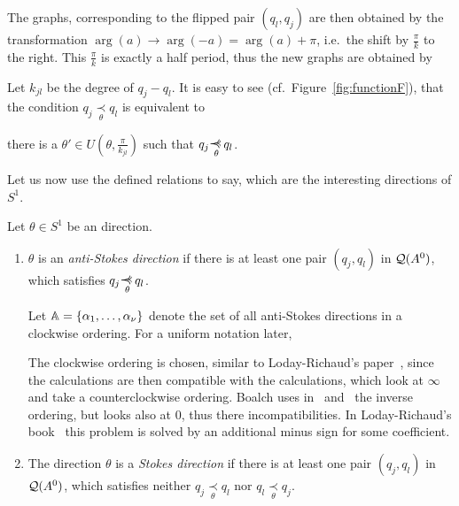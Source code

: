 The graphs, corresponding to the flipped pair $(q_l,q_j)$ are then obtained by
the transformation $\arg(a)\to\arg(-a)=\arg(a)+\pi$, i.e.\ the shift by
$\frac{\pi}{k}$ to the right. This $\frac{\pi}{k}$ is exactly a half period,
thus the new graphs are obtained by 
\begin{rem}\label{rem:relationDistanceCondition}
  Let $k_{jl}$ be the degree of $q_j-q_l$.
  It is easy to see (cf.\ Figure~\ref{fig:functionF}), that the condition
  $q_j \underset{\theta}{\prec} q_l$ is equivalent to
  \begin{einr}
    there is a $\theta'\in U(\theta,\frac{\pi}{k_{jl}})$ such that
    $q_j\myrel{\theta}q_l$.
  \end{einr}
\end{rem}
Let us now use the defined relations to say, which are the interesting
directions of $S^1$.
\begin{defn}\label{defn:antiStokesDir}
  Let $\theta\in S^1$ be an direction.
  \begin{enumerate}
    \item $\theta$ is an \emph{anti-Stokes direction} if there is at least one
      pair $(q_j,q_l)$ in $\mathcal{Q}(A^0)$, which satisfies $q_j\myrel{\theta}q_l$.

      Let $\mathbb{A}=\{\alpha_1,\dots,\alpha_{\nu}\}$ denote the set of all
      anti-Stokes directions in a clockwise ordering. For a uniform
      notation later, 
      \begin{s-rem}
        The clockwise ordering is chosen, similar to Loday-Richaud's
        paper~\cite{Loday1994}, since the calculations are then compatible with
        the calculations, which look at $\infty$ and take a
        counterclockwise ordering.
        Boalch uses in~\cite{boalch} and~\cite{thboalch} the inverse
        ordering, but looks also at $0$, thus there 
        incompatibilities.
        In Loday-Richaud's book~\cite{Loday2014} this problem is solved by
        an additional minus sign for some coefficient.
      \end{s-rem}
    \item The direction $\theta$ is a \emph{Stokes direction} if there is at
      least one pair $(q_j,q_l)$ in $\mathcal{Q}(A^0)$, which satisfies neither
      $q_j\underset{\theta}{\prec} q_l$ nor $q_l\underset{\theta}{\prec} q_j$.
      \begin{comment}
        Let $\S=\{\sigma_1<\cdots<\sigma_\mu\}$ be the set of Stokes directions.
      \end{comment}
  \end{enumerate}
\end{defn}
